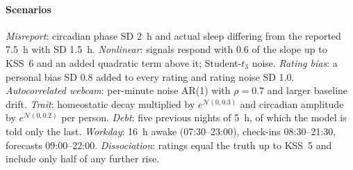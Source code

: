 \paragraph*{Scenarios} \emph{Misreport}: circadian phase SD 2~h and actual sleep differing from the reported 7.5~h with SD 1.5~h. \emph{Nonlinear}: signals respond with 0.6 of the slope up to KSS~6 and an added quadratic term above it; Student-$t_3$ noise. \emph{Rating bias}: a personal bias SD 0.8 added to every rating and rating noise SD 1.0. \emph{Autocorrelated webcam}: per-minute noise AR(1) with $\rho = 0.7$ and larger baseline drift. \emph{Trait}: homeostatic decay multiplied by $e^{\mathcal{N}(0, 0.3)}$ and circadian amplitude by $e^{\mathcal{N}(0, 0.2)}$ per person. \emph{Debt}: five previous nights of 5~h, of which the model is told only the last. \emph{Workday}: 16~h awake (07:30--23:00), check-ins 08:30--21:30, forecasts 09:00--22:00. \emph{Dissociation}: ratings equal the truth up to KSS~5 and include only half of any further rise.

